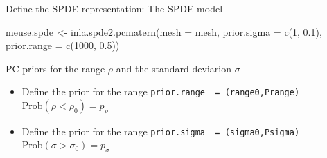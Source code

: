 \documentclass[
  ignorenonframetext,
]{beamer}
\newenvironment{Shaded}{\begin{snugshade}}{\end{snugshade}}
\newcommand{\AttributeTok}[1]{\textcolor[rgb]{0.77,0.63,0.00}{#1}}
\newcommand{\DecValTok}[1]{\textcolor[rgb]{0.00,0.00,0.81}{#1}}
\newcommand{\FloatTok}[1]{\textcolor[rgb]{0.00,0.00,0.81}{#1}}
\newcommand{\FunctionTok}[1]{\textcolor[rgb]{0.00,0.00,0.00}{#1}}
\newcommand{\NormalTok}[1]{#1}
\newcommand{\OtherTok}[1]{\textcolor[rgb]{0.56,0.35,0.01}{#1}}
\begin{document}
\begin{frame}[fragile]{Define the SPDE representation: The SPDE model}
\protect\hypertarget{define-the-spde-representation-the-spde-model}{}
\small

\begin{Shaded}
\begin{Highlighting}[]
\NormalTok{meuse.spde }\OtherTok{\textless{}{-}} \FunctionTok{inla.spde2.pcmatern}\NormalTok{(}\AttributeTok{mesh =}\NormalTok{ mesh,}
                                  \AttributeTok{prior.sigma =} \FunctionTok{c}\NormalTok{(}\DecValTok{1}\NormalTok{, }\FloatTok{0.1}\NormalTok{),}
                                  \AttributeTok{prior.range =} \FunctionTok{c}\NormalTok{(}\DecValTok{1000}\NormalTok{, }\FloatTok{0.5}\NormalTok{))}
\end{Highlighting}
\end{Shaded}

\normalsize

PC-priors for the range \(\rho\) and the standard deviarion \(\sigma\)

\begin{itemize}
\item
  Define the prior for the range
  \texttt{prior.range\ \ =\ (range0,Prange)}
  \(\text{Prob}(\rho<\rho_0) = p_{\rho}\)
\item
  Define the prior for the range
  \texttt{prior.sigma\ \ =\ (sigma0,Psigma)}
  \(\text{Prob}(\sigma>\sigma_0) = p_{\sigma}\)
\end{itemize}
\end{frame}
\end{document}
